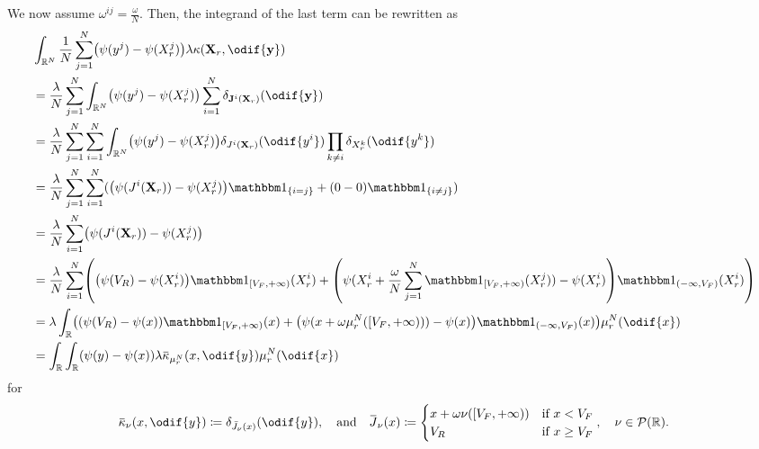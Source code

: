 We now assume \(\omega^{ij} = \frac{\omega}{N}\).
Then, the integrand of the last term can be rewritten as
\begin{equation}\label{eq:kappa-to-mean-kappa}
  \begin{split}
     & \int_{\potspace^N} \frac{1}{N} \sum_{j=1}^N \br*{ \psi(y^j) - \psi(X_{r}^j) } \lambda \kappa(\bm{X}_r, \odif{\bm{y}})                                                                  \\
     & = \frac{\lambda}{N} \sum_{j=1}^N \int_{\potspace^N} \br*{ \psi(y^j) - \psi(X_{r}^j) } \sum_{i=1}^N \delta_{\bm{\jtarg}^i(\bm{X}_r)}(\odif{\bm{y}})                                     \\
     & = \frac{\lambda}{N} \sum_{j=1}^N \sum_{i=1}^N \int_{\potspace^N} \br*{ \psi(y^j) - \psi(X_{r}^j) } \delta_{\jtarg^i(\bm{X}_r)}(\odif{y^i}) \prod_{k \neq i} \delta_{X_r^k}(\odif{y^k}) \\
     & = \frac{\lambda}{N} \sum_{j=1}^N \sum_{i=1}^N \br{ \br*{ \psi(\jtarg^i(\bm{X}_r)) - \psi(X_{r}^j) } \ind{i = j} + (0 - 0) \ind{i \neq j} }                                             \\
     & = \frac{\lambda}{N} \sum_{i=1}^N \br*{ \psi(\jtarg^i(\bm{X}_r)) - \psi(X_{r}^j) }                                                                                                      \\
     & = \frac{\lambda}{N} \sum_{i=1}^N \br*{ \br*{ \psi(V_R) - \psi(X_{r}^i) } \indE{[V_F,+\infty)}(X_{r}^i)
    + \br*{ \psi(X_{r}^i + \frac{\omega}{N} \sum_{j=1}^N \indE{[V_F,+\infty)}(X_{r}^j)) - \psi(X_{r}^i) } \indE{(-\infty,V_F)}(X_{r}^i) }                                                     \\
     & = \lambda \int_\potspace \br*{ \br*{ \psi(V_R) - \psi(x) } \indE{[V_F,+\infty)}(x)
    + \br*{ \psi(x + \omega \mu_r^N([V_F,+\infty))) - \psi(x) } \indE{(-\infty,V_F)}(x) } \mu_{r}^N(\odif{x})                                                           \\
     & = \int_\potspace \int_\potspace (\psi(y) - \psi(x)) \lambda \ol{\kappa}_{\mu_{r}^N}(x, \odif{y}) \mu_{r}^N(\odif{x})
  \end{split}
\end{equation}
for
\begin{equation}
  \ol{\kappa}_\nu(x, \odif{y}) \coloneqq \delta_{\bar{\jtarg}_\nu(x)}(\odif{y}),
  \quad\text{and}\quad
  \ol{\jtarg}_\nu(x) \coloneqq \begin{cases}
    x + \omega \nu([V_F,+\infty)) & \text{if } x < V_F    \\
    V_R                           & \text{if } x \geq V_F
  \end{cases}, \quad \nu \in \cP(\potspace).
\end{equation}
